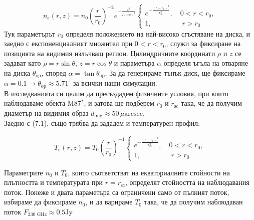 \begin{equation}
	n_e(r,z) = n_0\left(\frac{r}{r_0}\right)^{-2}e^{-\frac{z^2}{2(\alpha\rho)^2}}
	\begin{cases}
		e^{-\frac{(r-r_0)^2}{r^2_{\text{sc}}}},\quad 0 < r < r_0,\\
		1,\,\,\qquad\qquad r>r_0
	\end{cases}
\end{equation}
Тук параметърът $r_0$ определя положението на най-високо сгъстяване на диска, и заедно с експоненциалният множител при $0 < r < r_0$, служи за фиксиране на позицията на видимия излъчващ регион. Цилиндричните координати $\rho$ и $z$ се задават като $\rho = r\sin\theta$, $z = r\cos\theta$ и параметъра $\alpha$ определя ъгъла на отваряне на диска $\theta_{\text{op}}$, според $\alpha = \tan\theta_\text{op}$. За да генерираме тънък диск, ще фиксираме $\alpha = 0.1 \rightarrow \theta_{\text{op}}\approx 5.71^\circ$ за всички наши симулации.\\
В изследванията си целим да пресъздадем физичните условия, при които наблюдаваме обекта M87$^*$, и затова ще подберем $r_0$ и $r_\text{sc}$ така, че да получим диаметър на видимия образ $d_\text{img}\approx 50\, \mu\text{arcsec}$.\\

Заедно с (7.1), също трябва да зададем и температурен профил:

\begin{equation}
	T_e(r,z) = T_0\left(\frac{r}{r_0}\right)^{-1}
	\begin{cases}
		e^{-\frac{(r-r_0)^2}{r^2_{\text{sc}}}},\quad 0 < r < r_0,\\
		1,\,\,\qquad\qquad r>r_0
	\end{cases}
\end{equation}

Параметрите $n_0$ и $T_0$, които съответстват на екваториалните стойности на плътността и температурата при $r = r_\text{sc}$, определят стойността на наблюдавания поток. Понеже и двата параметъра са ограничени само от пълният поток, избираме да фиксираме $n_0$, и да варираме $T_0$ така, че да получим наблюдаван поток $F_{\text{230 GHz}} \approx 0.5 \text{Jy}$\\

